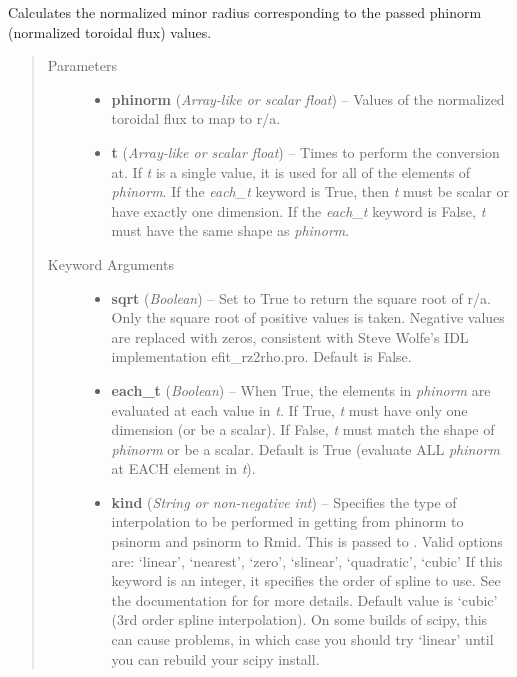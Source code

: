 \documentclass[letterpaper,10pt,english]{sphinxmanual}
\begin{document}
\begin{fulllineitems}
\begin{fulllineitems}
\label{eqtools:eqtools.core.Equilibrium.phinorm2roa}
Calculates the normalized minor radius corresponding to the passed phinorm (normalized toroidal flux) values.
\begin{quote}\begin{description}
\item[{Parameters}] \leavevmode\begin{itemize}
\item {} 
\textbf{phinorm} (\emph{Array-like or scalar float}) --
Values of the normalized
toroidal flux to map to r/a.

\item {} 
\textbf{t} (\emph{Array-like or scalar float}) --
Times to perform the conversion at.
If \emph{t} is a single value, it is used for all of the elements of
\emph{phinorm}. If the \emph{each\_t} keyword is True, then \emph{t} must be scalar
or have exactly one dimension. If the \emph{each\_t} keyword is False,
\emph{t} must have the same shape as \emph{phinorm}.

\end{itemize}

\item[{Keyword Arguments}] \leavevmode\begin{itemize}
\item {} 
\textbf{sqrt} (\emph{Boolean}) --
Set to True to return the square root of r/a.
Only the square root of positive values is taken. Negative
values are replaced with zeros, consistent with Steve Wolfe's
IDL implementation efit\_rz2rho.pro. Default is False.

\item {} 
\textbf{each\_t} (\emph{Boolean}) --
When True, the elements in \emph{phinorm} are evaluated
at each value in \emph{t}. If True, \emph{t} must have only one dimension
(or be a scalar). If False, \emph{t} must match the shape of \emph{phinorm}
or be a scalar. Default is True (evaluate ALL \emph{phinorm} at EACH
element in \emph{t}).

\item {} 
\textbf{kind} (\emph{String or non-negative int}) --
Specifies the type of
interpolation to be performed in getting from phinorm to
psinorm and psinorm to Rmid. This is passed to
. Valid options are:
`linear', `nearest', `zero', `slinear', `quadratic', `cubic'
If this keyword is an integer, it specifies the order of spline
to use. See the documentation for  for more
details. Default value is `cubic' (3rd order spline
interpolation). On some builds of scipy, this can cause problems,
in which case you should try `linear' until you can rebuild your
scipy install.


\end{itemize}
\end{description}
\end{quote}
\end{fulllineitems}
\end{fulllineitems}
\end{document}
